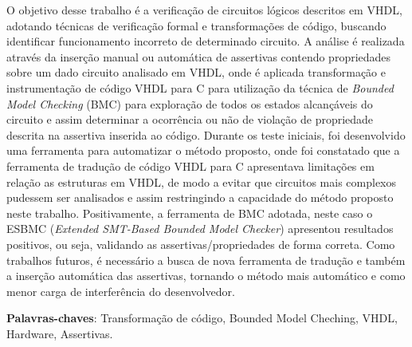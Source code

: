 O objetivo desse trabalho é a verificação de circuitos lógicos descritos em VHDL, adotando técnicas de verificação formal e transformações de código, buscando identificar funcionamento incorreto de determinado circuito. A análise é realizada através da inserção manual ou automática de assertivas contendo propriedades sobre um dado circuito analisado em VHDL, onde é aplicada transformação e instrumentação de código VHDL para C para utilização da técnica de \textit{Bounded Model Checking} (BMC) para exploração de todos os estados alcançáveis do circuito e assim determinar a ocorrência ou não de violação de propriedade descrita na assertiva inserida ao código. Durante os teste iniciais, foi desenvolvido uma ferramenta para automatizar o método proposto, onde foi constatado que a ferramenta de tradução de código VHDL para C apresentava limitações em relação as estruturas em VHDL, de modo a evitar que circuitos mais complexos pudessem ser analisados e assim restringindo a capacidade do método proposto neste trabalho. Positivamente, a ferramenta de BMC adotada, neste caso o ESBMC (\textit{Extended SMT-Based Bounded Model Checker}) apresentou resultados positivos, ou seja, validando as assertivas/propriedades de forma correta. Como trabalhos futuros, é necessário a busca de nova ferramenta de tradução e também a inserção automática das assertivas, tornando o método mais automático e como menor carga de interferência do desenvolvedor.
\vspace{\onelineskip}
\noindent
\par
\textbf{Palavras-chaves}: Transformação de código, Bounded Model Cheching, VHDL, Hardware, Assertivas.